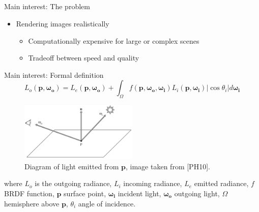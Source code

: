\documentclass{beamer}
\begin{document}
\subsection{ }
\begin{frame}{Main interest: The problem}
\begin{itemize}
\setlength\itemsep{0.5em}
\item Rendering images realistically
	\begin{itemize}
	\setlength\itemsep{0.5em}
	\item Computationally expensive for large or complex scenes
	\item Tradeoff between speed and quality
	\end{itemize}
\end{itemize}
\end{frame}

\begin{frame}{Main interest: Formal definition}
\begin{equation*}  
L_o (\mathbf{p}, \boldsymbol{\omega_o}) = L_e(\mathbf{p}, \boldsymbol{\omega_o}) + \int_\Omega f(\mathbf{p}, \boldsymbol{\omega_o}, \boldsymbol{\omega_i}) L_i(\mathbf{p}, \boldsymbol{\omega_i}) | \cos \theta_i | d \boldsymbol{\omega_i}
\end{equation*}

\begin{multicols}{2}
\begin{figure}[b!]
\includegraphics[width=0.5\textwidth]{img/render_definition}
\caption*{\tiny{Diagram of light emitted from $\mathbf{p}$, image taken from [PH10].}}
\end{figure}

\vfill
\columnbreak
\vspace*{\fill}
\small{where $L_o$ is the outgoing radiance, $L_i$ incoming radiance, $L_e$ emitted radiance, $f$ BRDF function, $\mathbf{p}$ surface point, $\boldsymbol{\omega_i}$ incident light, $\boldsymbol{\omega_o}$ outgoing light, $\Omega$ hemisphere above $\mathbf{p}$, $\theta_i$ angle of incidence. }
\end{multicols}
\end{frame}
\end{document}

